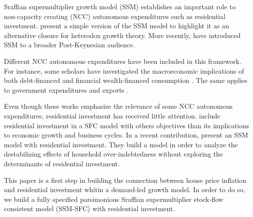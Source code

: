 \documentclass[12pt]{article}
\begin{document}
Sraffian supermultiplier growth model (SSM) establishes an important role to non-capacity creating (NCC) autonomous expenditures such
as residential investment.
\textcite{serrano_long_1995,serrano_sraffian_2017} present a simple version of the SSM model to highlight it as an alternative closure for heterodox growth theory.
More recently, \textcites{allain_tackling_2015}{lavoie_post-keynesian_2015}{lavoie_convergence_2016} have introduced SSM to a broader Post-Keynesian audience.

Different NCC autonomous expenditures have been included in this framework. 
For instance, some scholars have investigated the macroeconomic implications of both debt-financed \cites{pariboni_autonomous_2015}{fagundes_role_2017}{mandarino-2020-worker-debt} and financial wealth-financed consumption \cite{brochier_supermultiplier_2018}.
The same applies to government expenditures \cites{allain_tackling_2015}{bougrine_autonomous_2020} and exports \cite{nah_long-run_2017}.

Even though these works emphasize the relevance of some NCC autonomous expenditures, residential investment has received little attention.
\textcites{zezza_u.s._2008}{nikolaidi_securitisation_2015} include residential investment in a SFC model with others objectives than its implications to economic growth and business cycles.
In a recent contribution, \textcite{dejuan_supermultiplier-cum-finance_2018} present an SSM model with residential investment.
They build a model in order to analyze the destabilizing effects of household over-indebtedness without exploring the determinants of residential investment.

This paper is a first step in building the connection between house price inflation and residential investment whitin a demand-led growth model.
In order to do so, we build a fully specified parsimonious Sraffian supermultiplier stock-flow consistent model (SSM-SFC) with residential investment.
\end{document}
